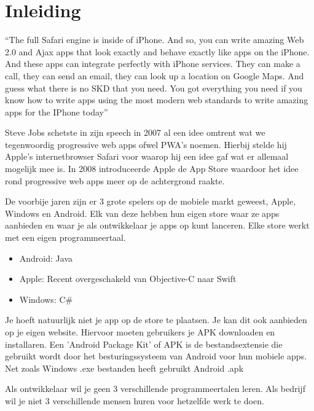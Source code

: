 

\chapter{Inleiding}
\label{ch:inleiding}

“The full Safari engine is inside of iPhone. And so, you can write amazing Web 2.0 and Ajax apps that look exactly and behave exactly like apps on the iPhone. And these apps can integrate perfectly with iPhone services. They can make a call, they can send an email, they can look up a location on Google Maps. And guess what there is no SKD that you need. You got everything you need if you know how to write apps using the most modern web standards to write amazing apps for the IPhone today” ~\autocite{keynote2007}

Steve Jobs schetste in zijn speech in 2007 al een idee omtrent wat we tegenwoordig progressive web apps ofwel PWA's noemen. Hierbij stelde hij Apple's internetbrowser Safari voor waarop hij een idee gaf wat er allemaal mogelijk mee is. In 2008 introduceerde Apple de App Store waardoor het idee rond progressive web apps meer op de achtergrond raakte.

De voorbije jaren zijn er 3 grote spelers op de mobiele markt geweest, Apple, Windows en Android. Elk van deze hebben hun eigen store waar ze apps aanbieden en waar je als ontwikkelaar je apps op kunt lanceren. Elke store werkt met een eigen programmeertaal.
\begin{itemize}  
	\item Android: Java
	\item Apple: Recent overgeschakeld van Objective-C naar Swift
	\item Windows: C\#
\end{itemize}

Je hoeft natuurlijk niet je app op de store te plaatsen. Je kan dit ook aanbieden op je eigen website. Hiervoor moeten gebruikers je APK downloaden en installaren. Een 'Android Package Kit' of APK is de bestandsextensie die gebruikt wordt door het besturingssysteem van Android voor hun mobiele apps. Net zoals Windows .exe bestanden heeft gebruikt Android .apk ~\autocite{apk}

Als ontwikkelaar wil je geen 3 verschillende programmeertalen leren. Als bedrijf wil je niet 3 verschillende mensen huren voor hetzelfde werk te doen.

